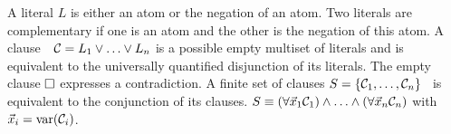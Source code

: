 
\begin{definition}\label{def:literals}
A {\myem literal} $L$ is either an atom
or the negation of an atom.
Two literals are complementary if one is an atom and the other is the negation of this atom.
%
A {\myem clause}\ \ ${\mathcal C} = L_1\lor\ldots\lor L_n$  is a possible empty multiset of literals 
and is equivalent to the universally quantified disjunction of its literals.
The {\myem empty clause} $\square$ expresses a contradiction. 
A finite {\myem set of clauses} $S=\{ {\mathcal C}_1,\ldots,{\mathcal C}_n \}$ 
is equivalent to the conjunction of its clauses.
$S\equiv(\forall\vec{x}_1{\mathcal C}_1)\land\ldots\land(\forall\vec{x}_n{\mathcal C}_n)$ with 
$\vec{x}_i = \operatorname{var}({\mathcal C}_i)$.
\end{definition}